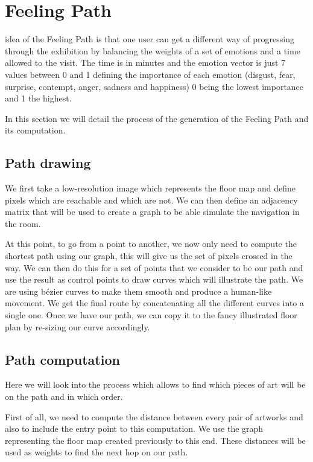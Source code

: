 \documentclass[journal, a4paper]{IEEEtran}
\begin{document}
\section{Feeling Path} \label{sec:path}
 idea of the Feeling Path is that one user can get a different way of progressing through the exhibition by balancing the weights of a set of emotions and a time allowed to the visit. The time is in minutes and the emotion vector is just 7 values between 0 and 1 defining the importance of each emotion (disgust, fear, surprise, contempt, anger, sadness and happiness) 0 being the lowest importance and 1 the highest.

In this section we will detail the process of the generation of the Feeling Path and its computation.

\subsection{Path drawing}
We first take a low-resolution image which represents the floor map and define pixels which are reachable and which are not. We can then define an adjacency matrix that will be used to create a graph to be able simulate the navigation in the room. 

At this point, to go from a point to another, we now only need to compute the shortest path using our graph, this will give us the set of pixels crossed in the way. We can then do this for a set of points that we consider to be our path and use the result as control points to draw curves which will illustrate the path. We are using b\'ezier curves to make them smooth and produce a human-like movement. We get the final route by concatenating all the different curves into a single one.
Once we have our path, we can copy it to the fancy illustrated floor plan by re-sizing our curve accordingly.

\subsection{Path computation}
Here we will look into the process which allows to find which pieces of art will be on the path and in which order.

First of all, we need to compute the distance between every pair of artworks and also to include the entry point to this computation. We use the graph representing the floor map created previously to this end. These distances will be used as weights to find the next hop on our path.
\end{document}
